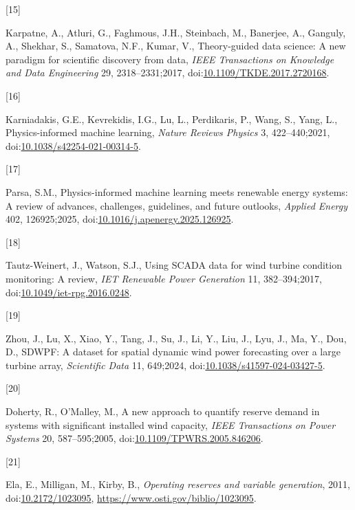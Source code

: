 \documentclass[
  11pt]{article}
\newlength{\cslhangindent}
\newlength{\csllabelwidth}
\newenvironment{CSLReferences}[2] %
 {\begin{list}{}{%
  \setlength{\itemindent}{0pt}
  \setlength{\leftmargin}{0pt}
  \setlength{\parsep}{0pt}
  \ifodd #1
   \setlength{\leftmargin}{\cslhangindent}
   \setlength{\itemindent}{-1\cslhangindent}
  \fi
  \setlength{\itemsep}{#2\baselineskip}}}
 {\end{list}}
\newcommand{\CSLLeftMargin}[1]{\parbox[t]{\csllabelwidth}{\strut#1\strut}}
\newcommand{\CSLRightInline}[1]{\parbox[t]{\linewidth - \csllabelwidth}{\strut#1\strut}}
\begin{document}
\begin{CSLReferences}{0}{0}
\CSLLeftMargin{{[}15{]} }%
\CSLRightInline{Karpatne, A., Atluri, G., Faghmous, J.H., Steinbach, M.,
Banerjee, A., Ganguly, A., Shekhar, S., Samatova, N.F., Kumar, V.,
Theory-guided data science: A new paradigm for scientific discovery from
data, \emph{IEEE Transactions on Knowledge and Data Engineering} 29,
2318--2331;2017,
doi:\href{https://doi.org/10.1109/TKDE.2017.2720168}{10.1109/TKDE.2017.2720168}.}

\CSLLeftMargin{{[}16{]} }%
\CSLRightInline{Karniadakis, G.E., Kevrekidis, I.G., Lu, L., Perdikaris,
P., Wang, S., Yang, L., Physics-informed machine learning, \emph{Nature
Reviews Physics} 3, 422--440;2021,
doi:\href{https://doi.org/10.1038/s42254-021-00314-5}{10.1038/s42254-021-00314-5}.}

\CSLLeftMargin{{[}17{]} }%
\CSLRightInline{Parsa, S.M., Physics-informed machine learning meets
renewable energy systems: A review of advances, challenges, guidelines,
and future outlooks, \emph{Applied Energy} 402, 126925;2025,
doi:\href{https://doi.org/10.1016/j.apenergy.2025.126925}{10.1016/j.apenergy.2025.126925}.}

\CSLLeftMargin{{[}18{]} }%
\CSLRightInline{Tautz-Weinert, J., Watson, S.J., Using SCADA data for
wind turbine condition monitoring: A review, \emph{IET Renewable Power
Generation} 11, 382--394;2017,
doi:\href{https://doi.org/10.1049/iet-rpg.2016.0248}{10.1049/iet-rpg.2016.0248}.}

\CSLLeftMargin{{[}19{]} }%
\CSLRightInline{Zhou, J., Lu, X., Xiao, Y., Tang, J., Su, J., Li, Y.,
Liu, J., Lyu, J., Ma, Y., Dou, D., SDWPF: A dataset for spatial dynamic
wind power forecasting over a large turbine array, \emph{Scientific
Data} 11, 649;2024,
doi:\href{https://doi.org/10.1038/s41597-024-03427-5}{10.1038/s41597-024-03427-5}.}

\CSLLeftMargin{{[}20{]} }%
\CSLRightInline{Doherty, R., O'Malley, M., A new approach to quantify
reserve demand in systems with significant installed wind capacity,
\emph{IEEE Transactions on Power Systems} 20, 587--595;2005,
doi:\href{https://doi.org/10.1109/TPWRS.2005.846206}{10.1109/TPWRS.2005.846206}.}

\CSLLeftMargin{{[}21{]} }%
\CSLRightInline{Ela, E., Milligan, M., Kirby, B., \emph{Operating
reserves and variable generation}, 2011,
doi:\href{https://doi.org/10.2172/1023095}{10.2172/1023095},
\url{https://www.osti.gov/biblio/1023095}.}


\end{CSLReferences}
\end{document}
